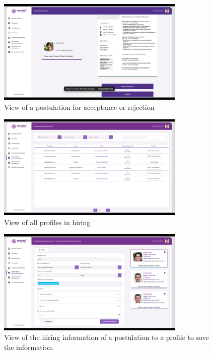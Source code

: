 \documentclass{scrreprt}
\begin{document}
\begin{figure}[H]
	\centering \small
	\includegraphics[width=0.8\textwidth]{WebPrototype/wflow-33.jpeg}
	\caption{View of a postulation for acceptance or rejection}
\end{figure}

\begin{figure}[H]
	\centering \small
	\includegraphics[width=0.8\textwidth]{WebPrototype/wflow-34.jpeg}
	\caption{View of all profiles in hiring}
\end{figure}

\begin{figure}[H]
	\centering \small
	\includegraphics[width=0.8\textwidth]{WebPrototype/wflow-35.jpeg}
	\caption{View of the hiring information of a postulation to a profile to save the information.}
\end{figure}
\end{document}
